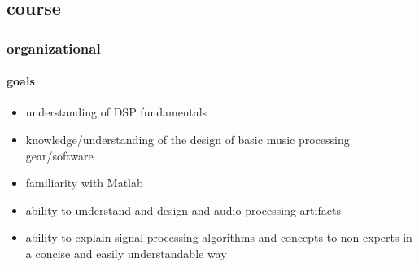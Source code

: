 \subsection{course}
    \begin{frame}\frametitle{organizational}\framesubtitle{goals}
        \begin{itemize}
            \item	understanding of DSP fundamentals
            \pause
            \item   knowledge/understanding of the design of basic music processing gear/software
            \pause
            \item	familiarity with Matlab
            \pause
            \item   ability to understand and design and audio processing artifacts
            \pause
            \item   ability to explain signal processing algorithms and concepts to non-experts in a concise and easily understandable way
        \end{itemize}
        \vspace{30mm}
    \end{frame}

